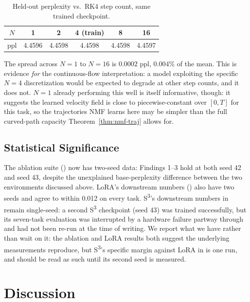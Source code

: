 \documentclass[conference]{IEEEtran}
\newcommand{\sthree}{S\textsuperscript{3}}
\begin{document}
\begin{table}[t]
\centering
\caption{Held-out perplexity vs.\ RK4 step count, same trained checkpoint.}
\label{tab:ode-invariance}
\footnotesize
\begin{tabular}{@{}cccccc@{}}
\toprule
$N$ & 1 & 2 & 4 (train) & 8 & 16 \\
\midrule
ppl & 4.4596 & 4.4598 & 4.4598 & 4.4598 & 4.4597 \\
\bottomrule
\end{tabular}
\end{table}

The spread across $N=1$ to $N=16$ is $0.0002$ ppl, $0.004\%$ of the mean. This is evidence \emph{for} the continuous-flow interpretation: a model exploiting the specific $N{=}4$ discretization would be expected to degrade at other step counts, and it does not. $N{=}1$ already performing this well is itself informative, though: it suggests the learned velocity field is close to piecewise-constant over $[0,T]$ for this task, so the trajectories NMF learns here may be simpler than the full curved-path capacity Theorem~\ref{thm:nmf-traj} allows for.

\subsection{Statistical Significance}
\label{sec:stats}

The ablation suite () now has two-seed data: Findings 1--3 hold at both seed 42 and seed 43, despite the unexplained base-perplexity difference between the two environments discussed above. LoRA's downstream numbers () also have two seeds and agree to within 0.012 on every task. \sthree{}'s downstream numbers in  remain single-seed: a second \sthree{} checkpoint (seed 43) was trained successfully, but its seven-task evaluation was interrupted by a hardware failure partway through and had not been re-run at the time of writing. We report what we have rather than wait on it: the ablation and LoRA results both suggest the underlying measurements reproduce, but \sthree{}'s specific margin against LoRA in  is one run, and should be read as such until its second seed is measured.

\section{Discussion}
\label{sec:discussion}
\end{document}
